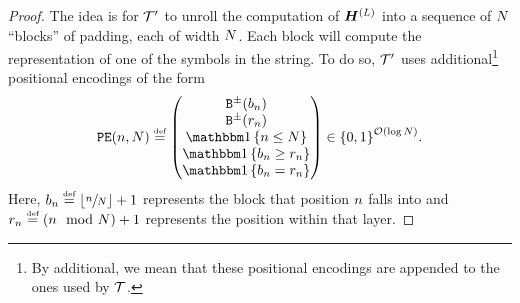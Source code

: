 \begin{proof}
   The idea is for ${{\mathcal{T}}}'$ to unroll the computation of ${{{{{\bm{H}}}}}}^{({{L}})}$ into a sequence of ${{N}}$ ``blocks'' of padding, each of width ${{N}}$. 
   Each block will compute the representation of one of the symbols in the string.
   To do so, ${{\mathcal{T}}}'$ uses additional\footnote{By additional, we mean that these positional encodings are appended to the ones used by ${{\mathcal{T}}}$.} positional encodings of the form
   \begin{equation} \label{eq:additional-pos-enc-1}
      \posEncFun{\stridx, \strlen} \defeq 
      \begin{pmatrix}
         \sbinFun{\paddingBlock_\stridx} \\
         \sbinFun{\relativePos_{\stridx}}  \\
         \ind{\stridx \le \strlen}  \\
         \ind{\paddingBlock_\stridx \ge \relativePos_{\stridx}}  \\
         \ind{\paddingBlock_\stridx = \relativePos_{\stridx}}  \\
      \end{pmatrix} \in \set{0, 1}^{\bigOFun{\log\strlen}}.
   \end{equation}
   Here, ${{b}}_{{n}} \mathrel{\stackrel{\textnormal{\tiny def}}{=}} {\left\lfloor \sfrac{{{n}}}{{{N}}} \right\rfloor} + 1$ represents the block that position ${{n}}$ falls into and ${{r}}_{{{n}}} \mathrel{\stackrel{\textnormal{\tiny def}}{=}} ({{n}} \mod {{{N}}}) + 1$ represents the position within that layer.
   

\end{proof}
